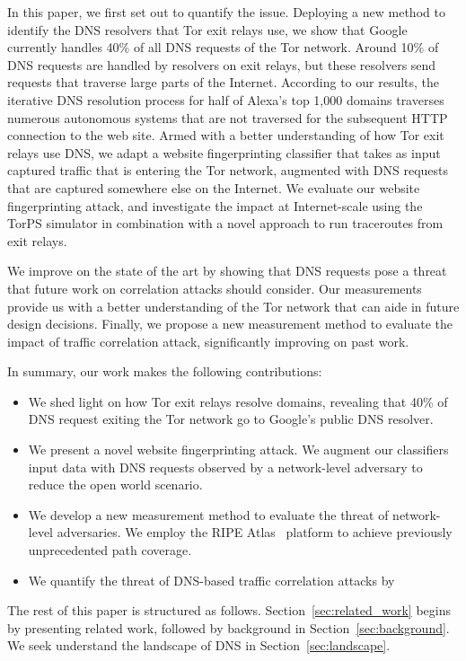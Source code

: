In this paper, we first set out to quantify the issue.  Deploying a new method
to identify the DNS resolvers that Tor exit relays use, we show that Google
currently handles 40\% of all DNS requests of the Tor network.  Around 10\% of
DNS requests are handled by resolvers on exit relays, but these resolvers send
requests that traverse large parts of the Internet.  According to our results,
the iterative DNS resolution process for half of Alexa's top 1,000 domains
traverses numerous autonomous systems that are not traversed for the subsequent
HTTP connection to the web site.  Armed with a better understanding of how Tor
exit relays use DNS, we adapt a website fingerprinting classifier that takes as
input captured traffic that is entering the Tor network, augmented with DNS
requests that are captured somewhere else on the Internet.  We evaluate our
website fingerprinting attack, and investigate the impact at Internet-scale
using the TorPS simulator in combination with a novel approach to run
traceroutes from exit relays.

We improve on the state of the art by showing that DNS requests pose a threat
that future work on correlation attacks should consider.  Our measurements
provide us with a better understanding of the Tor network that can aide in
future design decisions.  Finally, we propose a new measurement method to
evaluate the impact of traffic correlation attack, significantly improving on
past work.

In summary, our work makes the following contributions:
\begin{itemize}
	\item We shed light on how Tor exit relays resolve domains, revealing that
		40\% of DNS request exiting the Tor network go to Google's public DNS
		resolver.

	\item We present a novel website fingerprinting attack.  We augment our
		classifiers input data with DNS requests observed by a network-level
		adversary to reduce the open world scenario.

	\item We develop a new measurement method to evaluate the threat of
		network-level adversaries.  We employ the RIPE Atlas~\cite{atlas}
		platform to achieve previously unprecedented path coverage.

	\item We quantify the threat of DNS-based traffic correlation attacks by 
\end{itemize}

The rest of this paper is structured as follows.
Section~\ref{sec:related_work} begins by presenting related work, followed by
background in Section~\ref{sec:background}.  We seek understand the landscape
of DNS in Section~\ref{sec:landscape}.
